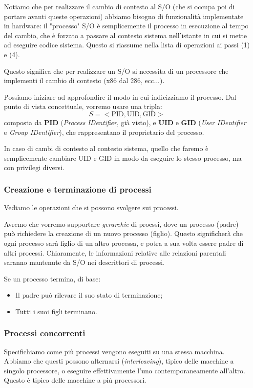 \documentclass[a4paper,11pt]{article}
\begin{document}
Notiamo che per realizzare il cambio di contesto al S/O (che si occupa poi di portare avanti queste operazioni) abbiamo bisogno di funzionalità implementate in hardware: il "processo" S/O è semplicemente il processo in esecuzione al tempo del cambio, che è forzato a passare al contesto sistema nell'istante in cui si mette ad eseguire codice sistema.
Questo si riassume nella lista di operazioni ai passi (1) e (4).

Questo significa che per realizzare un S/O si necessita di un processore che implementi il cambio di contesto (x86 dal 286, ecc...). 

\par\smallskip

Possiamo iniziare ad approfondire il modo in cui indicizziamo il processo. Dal punto di vista concettuale, vorremo usare una tripla:
$$
S = < \text{PID}, \text{UID}, \text{GID} >
$$
composta da \textbf{PID} (\textit{Process IDentifier}, già visto), e \textbf{UID} e \textbf{GID} (\textit{User IDentifier} e \textit{Group IDentifier}), che rappresentano il proprietario del processo.

In caso di cambi di contesto al contesto sistema, quello che faremo è semplicemente cambiare UID e GID in modo da eseguire lo stesso processo, ma con privilegi diversi.

\subsubsection{Creazione e terminazione di processi}
Vediamo le operazioni che si possono svolgere sui processi.

Avremo che vorremo supportare \textit{gerarchie} di procssi, dove un processo (padre) può richiedere la creazione di un nuovo processo (figlio).
Questo significherà che ogni processo sarà figlio di un altro processa, e potra a sua volta essere padre di altri processi.
Chiaramente, le informazioni relative alle relazioni parentali saranno mantenute da S/O nei descrittori di processi.

Se un processo termina, di base:
\begin{itemize}
	\item Il padre può rilevare il suo stato di terminazione;
	\item Tutti i suoi figli terminano.
\end{itemize}

\subsubsection{Processi concorrenti}
Specifichiamo come più processi vengono eseguiti su una stessa macchina.
Abbiamo che questi possono alternarsi (\textit{interleaving}), tipico delle macchine a singolo processore, o eseguire effettivamente l'uno contemporaneamente all'altro. Questo è tipico delle macchine a più processori.
\end{document}
